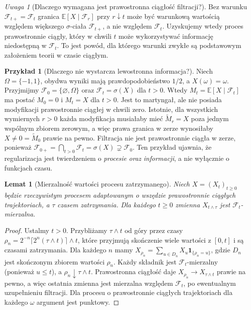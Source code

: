 \documentclass[11pt,a4paper,oneside]{report}
\numberwithin{equation}{chapter}
\theoremstyle{plain}
\newtheorem{lemat}[twierdzenie]{Lemat}
\theoremstyle{definition}
\newtheorem{przyklad}{Przykład}[chapter]
\theoremstyle{remark}
\newtheorem{uwaga}{Uwaga}[chapter]
\newcommand{\E}{\mathbb{E}}
\newcommand{\calF}{\mathcal{F}}
\newcommand{\ind}[1]{\mathbf{1}_{#1}}
\begin{document}
\begin{uwaga}[Dlaczego wymagana jest prawostronna ciągłość filtracji?]
Bez warunku $\calF_{t+}=\calF_t$ granica
$\E[X\mid\calF_r]$ przy $r\downarrow t$ może być
warunkową wartością względem większego $\sigma$-ciała
$\calF_{t+}$, a nie względem $\calF_t$.
Uzyskujemy wtedy proces prawostronnie ciągły, który w chwili
$t$ może wykorzystywać informację niedostępną w $\calF_t$.
To jest powód, dla którego warunki zwykłe są podstawowym
założeniem teorii w czasie ciągłym.
\end{uwaga}


\begin{przyklad}[Dlaczego nie wystarcza lewostronna informacja?]
Niech $\Omega=\{-1,1\}$, obydwa wyniki mają prawdopodobieństwo
$1/2$, a $X(\omega)=\omega$. Przyjmijmy $\calF_0=\{\varnothing,\Omega\}$
oraz $\calF_t=\sigma(X)$ dla $t>0$. Wtedy
$M_t=\E[X\mid\calF_t]$ ma postać $M_0=0$ i $M_t=X$ dla $t>0$.
Jest to martyngał, ale nie posiada modyfikacji prawostronnie ciągłej
w chwili zero. Istotnie, dla wszystkich wymiernych $r>0$
każda modyfikacja musiałaby mieć $\widetilde M_r=X$ poza jednym
wspólnym zbiorem zerowym, a więc prawa granica w zerze wynosiłaby
$X\ne0=\widetilde M_0$ prawie na pewno. Filtracja nie jest
prawostronnie ciągła w zerze, ponieważ
$\calF_{0+}=\bigcap_{t>0}\calF_t=\sigma(X)\supsetneq\calF_0$.
Ten przykład ujawnia, że regularizacja jest twierdzeniem o
\emph{procesie oraz informacji}, a nie wyłącznie o funkcjach czasu.
\end{przyklad}

\begin{lemat}[Mierzalność wartości procesu zatrzymanego]
Niech $X=(X_t)_{t\ge0}$ będzie rzeczywistym procesem adaptowanym
o wszędzie prawostronnie ciągłych trajektoriach, a $\tau$ czasem zatrzymania.
Dla każdego $t\ge0$ zmienna $X_{t\wedge\tau}$ jest $\calF_t$-mierzalna.
\end{lemat}
\begin{proof}
Ustalmy $t>0$. Przybliżamy $\tau\wedge t$ od góry przez czasy
$\rho_n=2^{-n}\lceil2^n(\tau\wedge t)\rceil\wedge t$, które
przyjmują skończenie wiele wartości z $[0,t]$ i są czasami
zatrzymania. Dla każdego $n$ mamy
$X_{\rho_n}=\sum_{u\in D_n}X_u\ind{\{\rho_n=u\}}$,
gdzie $D_n$ jest skończonym zbiorem wartości $\rho_n$.
Każdy składnik jest $\calF_t$-mierzalny (ponieważ $u\le t$),
a $\rho_n\downarrow\tau\wedge t$. Prawostronna ciągłość daje
$X_{\rho_n}\to X_{\tau\wedge t}$ prawie na pewno, a więc ostatnia
zmienna jest mierzalna względem $\calF_t$, po ewentualnym
uzupełnieniu filtracji. Dla procesu o prawostronnie ciągłych
trajektoriach dla każdego $\omega$ argument jest punktowy.
\end{proof}
\end{document}
